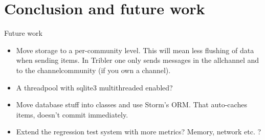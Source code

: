 \chapter{Conclusion and future work}
\label{cpt:conclusion_and_future_work}

Future work

\begin{itemize}
	\item Move storage to a per-community level. This will mean less flushing of data when sending items. In Tribler one only sends messages in the allchannel and to the channelcommunity (if you own a channel).
	\item A threadpool with sqlite3 multithreaded enabled? 
	\item Move database stuff into classes and use Storm's ORM. That auto-caches items, doesn't commit immediately.
	\item Extend the regression test system with more metrics? Memory, network etc. ?
\end{itemize}